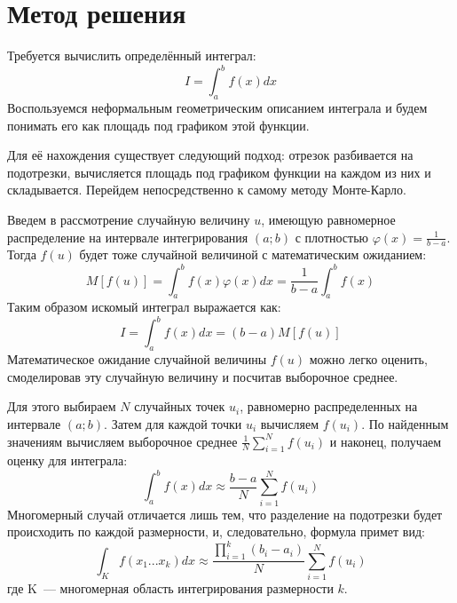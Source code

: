 \documentclass{report}
\begin{document}
\newpage

\section*{Метод решения}
\indent\par Требуется вычислить определённый интеграл: \begin{equation}I = \int_{a}^{b}{f(x)dx}\end{equation}
\indent Воспользуемся неформальным геометрическим описанием интеграла и будем понимать его как площадь под графиком этой функции.
\par Для её нахождения существует следующий подход: отрезок разбивается на подотрезки, вычисляется площадь под графиком функции на каждом из них и складывается. Перейдем непосредственно к самому методу Монте-Карло.
\par Введем в рассмотрение случайную величину $u$, имеющую равномерное распределение на интервале интегрирования $(a;b)$ с плотностью $\varphi {(x)} = \frac{1}{b-a}$.
Тогда $f(u)$ будет тоже случайной величиной с математическим ожиданием: \begin{equation}M[f(u)]=\int_{a}^{b}{f(x) \varphi {(x)}dx} = \frac{1}{b-a}\int_{a}^{b}{f(x)}\end{equation}
\indent Таким образом искомый интеграл выражается как: \begin{equation}I = \int_{a}^{b}{f(x)dx} = (b-a)M[f(u)]\end{equation}
\indent Математическое ожидание случайной величины $f(u)$ можно легко оценить, смоделировав эту случайную величину и посчитав выборочное среднее.
\par Для этого выбираем $N$ случайных точек $u_{i}$, равномерно распределенных на интервале $(a;b)$. Затем для каждой точки $u_{i}$ вычисляем $f(u_{i})$. По найденным значениям вычисляем 
выборочное среднее $\frac{1}{N}\sum_{i=1}^{N}{f(u_{i})}$ и наконец, получаем оценку для интеграла: \begin{equation}\int_{a}^{b}{f(x)dx} \approx \frac{b-a}{N}\sum_{i=1}^{N}{f(u_{i})} \end{equation}
\indent Многомерный случай отличается лишь тем, что разделение на подотрезки будет происходить по каждой размерности, и, следовательно, формула примет вид:
\begin{equation}\int_{K}^{}{f(x_{1}...x_{k})dx} \approx \frac{\prod_{i=1}^{k}{(b_{i}-a_{i})}}{N}\sum_{i=1}^{N}{f(u_{i})} \end{equation}
\indent где K~--- многомерная область интегрирования размерности $k$.
\newpage
\end{document}
